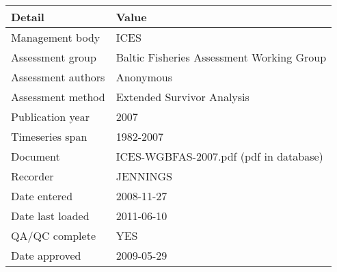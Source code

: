 \begin{table}[htb]
\centering
\begin{tabular}{lp{7cm}}
\toprule
Detail & Value \\
\midrule
Management body    & ICES                                      \\
Assessment group   & Baltic Fisheries Assessment Working Group \\
Assessment authors & Anonymous                                 \\
Assessment method  & Extended Survivor Analysis                \\
Publication year   & 2007                                      \\
Timeseries span    & 1982-2007                                 \\
Document           & ICES-WGBFAS-2007.pdf (pdf in database)    \\
Recorder           & JENNINGS                                  \\
Date entered       & 2008-11-27                                \\
Date last loaded   & 2011-06-10                                \\
QA/QC complete     & YES                                       \\
Date approved      & 2009-05-29                                \\
\bottomrule
\end{tabular}
\label{tab:assessdet}
\end{table}
